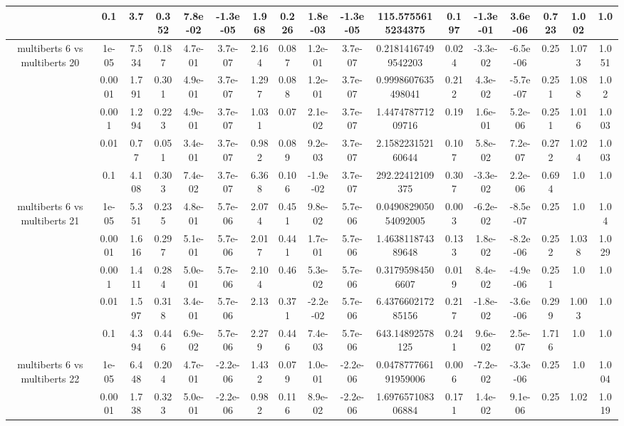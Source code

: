 \begin{tabular}{|c|c|c|c|c|c|c|c|c|c|c|c|c|c|c|c|c|}
 & 0.1 & 3.7 & 0.352 & 7.8e-02 & -1.3e-05 & 1.968 & 0.226 & 1.8e-03 & -1.3e-05 & 115.5755615234375 & 0.197 & -1.3e-01 & 3.6e-06 & 0.723 & 1.002 & 1.0 \\
\hline
\multirow{5}{*}{multiberts 6 vs multiberts 20} & 1e-05 & 7.534 & 0.187 & 4.7e-01 & 3.7e-07 & 2.164 & 0.087 & 1.2e-01 & 3.7e-07 & 0.21814167499542203 & 0.024 & -3.3e-02 & -6.5e-06 & 0.25 & 1.073 & 1.051 \\
 & 0.0001 & 1.791 & 0.301 & 4.9e-01 & 3.7e-07 & 1.297 & 0.088 & 1.2e-01 & 3.7e-07 & 0.9998607635498041 & 0.212 & 4.3e-02 & -5.7e-07 & 0.251 & 1.088 & 1.02 \\
 & 0.001 & 1.294 & 0.223 & 4.9e-01 & 3.7e-07 & 1.031 & 0.07 & 2.1e-02 & 3.7e-07 & 1.447478771209716 & 0.19 & 1.6e-01 & 5.2e-06 & 0.251 & 1.016 & 1.003 \\
 & 0.01 & 0.77 & 0.051 & 3.4e-01 & 3.7e-07 & 0.982 & 0.089 & 9.2e-03 & 3.7e-07 & 2.158223152160644 & 0.107 & 5.8e-02 & 7.2e-07 & 0.272 & 1.024 & 1.003 \\
 & 0.1 & 4.108 & 0.303 & 7.4e-02 & 3.7e-07 & 6.368 & 0.106 & -1.9e-02 & 3.7e-07 & 292.22412109375 & 0.307 & -3.3e-02 & 2.2e-06 & 0.694 & 1.0 & 1.0 \\
\hline
\multirow{5}{*}{multiberts 6 vs multiberts 21} & 1e-05 & 5.351 & 0.235 & 4.8e-01 & 5.7e-06 & 2.074 & 0.451 & 9.8e-02 & 5.7e-06 & 0.049082905054092005 & 0.003 & -6.2e-02 & -8.5e-07 & 0.25 & 1.0 & 1.04 \\
 & 0.0001 & 1.616 & 0.297 & 5.1e-01 & 5.7e-06 & 2.017 & 0.441 & 1.7e-01 & 5.7e-06 & 1.463811874389648 & 0.133 & 1.8e-02 & -8.2e-06 & 0.252 & 1.038 & 1.029 \\
 & 0.001 & 1.411 & 0.284 & 5.0e-01 & 5.7e-06 & 2.104 & 0.46 & 5.3e-02 & 5.7e-06 & 0.31795984506607 & 0.019 & 8.4e-02 & -4.9e-06 & 0.251 & 1.0 & 1.0 \\
 & 0.01 & 1.597 & 0.318 & 3.4e-01 & 5.7e-06 & 2.13 & 0.371 & -2.2e-02 & 5.7e-06 & 6.437660217285156 & 0.217 & -1.8e-02 & -3.6e-06 & 0.299 & 1.003 & 1.0 \\
 & 0.1 & 4.394 & 0.446 & 6.9e-02 & 5.7e-06 & 2.279 & 0.446 & 7.4e-03 & 5.7e-06 & 643.14892578125 & 0.241 & 9.6e-02 & 2.5e-07 & 1.716 & 1.0 & 1.0 \\
\hline
\multirow{5}{*}{multiberts 6 vs multiberts 22} & 1e-05 & 6.448 & 0.204 & 4.7e-01 & -2.2e-06 & 1.432 & 0.079 & 1.0e-01 & -2.2e-06 & 0.047877766191959006 & 0.006 & -7.2e-02 & -3.3e-06 & 0.25 & 1.0 & 1.004 \\
 & 0.0001 & 1.738 & 0.323 & 5.0e-01 & -2.2e-06 & 0.982 & 0.116 & 8.9e-02 & -2.2e-06 & 1.697657108306884 & 0.171 & 1.4e-02 & 9.1e-06 & 0.25 & 1.02 & 1.019 \\

\end{tabular}
